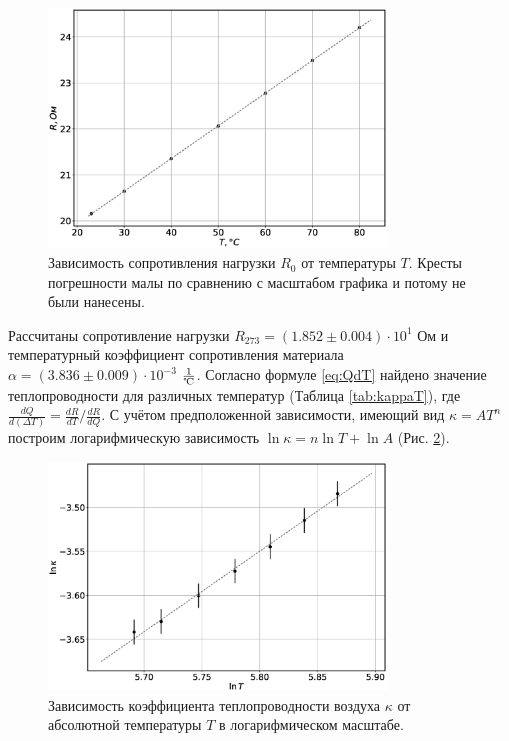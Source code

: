 \documentclass[12pt]{article}
\begin{document}
\begin{figure}[H]
    \centering
    \includegraphics[width=0.8\textwidth]{RT.eps}
    \caption{Зависимость сопротивления нагрузки \(R_0\) от температуры \(T\). Кресты погрешности малы по сравнению с масштабом графика и потому не были нанесены.}
    \label{fig:RT}
\end{figure}
Рассчитаны сопротивление нагрузки \(R_{273} = (1.852 \pm 0.004) \cdot 10 ^ {1}\) Ом и температурный коэффициент сопротивления материала 
\(\alpha = (3.836 \pm 0.009) \cdot 10 ^ {-3} \) \(\frac{1}{\textrm{\textcelsius}}\).
Согласно формуле \ref{eq:QdT} найдено значение теплопроводности для различных температур (Таблица \ref{tab:kappaT}), где \(\frac{d Q}{d (\Delta T)} = \frac{d R}{d T} / \frac{d R}{d Q}\).
С учётом предположенной зависимости, имеющий вид \(\kappa = A T^{n} \) построим логарифмическую зависимость \(\ln \kappa = n \ln T + \ln A\) (Рис. \ref{fig:lnkT}).   
\begin{figure}[H]
    \centering
    \includegraphics[width=0.8\textwidth]{lnkT.eps}
    \caption{Зависимость коэффициента теплопроводности воздуха \(\kappa \) от абсолютной температуры \(T\) в логарифмическом масштабе.}
    \label{fig:lnkT}
\end{figure}
\end{document}
